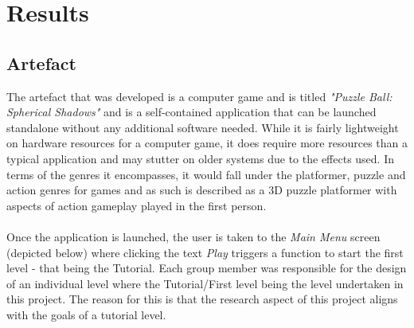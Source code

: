 
\chapter{Results} %

\label{Chapter4}  

\section{Artefact}
The artefact that was developed is a computer game and is titled \textit{"Puzzle Ball: Spherical Shadows"} and is a self-contained application that can be launched standalone without any additional software needed. While it is fairly lightweight on hardware resources for a computer game, it does require more resources than a typical application and may stutter on older systems due to the effects used. In terms of the genres it encompasses, it would fall under the platformer, puzzle and action genres for games and as such is described as a 3D puzzle platformer with aspects of action gameplay played in the first person.
\\\\
Once the application is launched, the user is taken to the \textit{Main Menu} screen (depicted below) where clicking the text \textit{Play} triggers a function to start the first level - that being the Tutorial. Each group member was responsible for the design of an individual level where the Tutorial/First level being the level undertaken in this project. The reason for this is that the research aspect of this project aligns with the goals of a tutorial level. 


